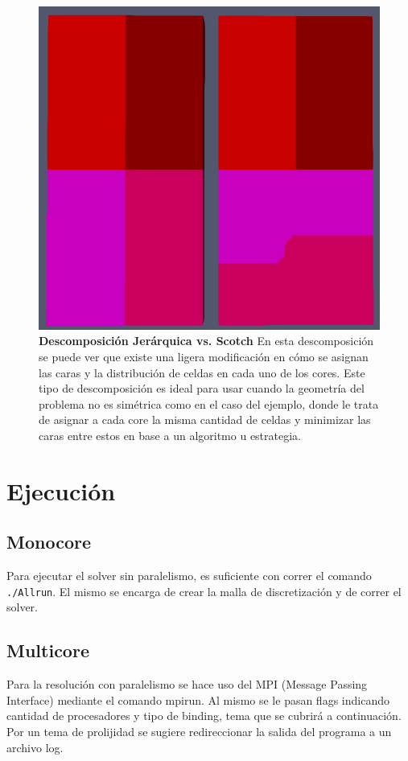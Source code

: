 \documentclass{article}
\begin{document}
\begin{figure} 
    \centering
    \includegraphics[scale=0.5]{../res/imgs/image6.png}
    \caption{\textbf{Descomposición Jerárquica vs. Scotch} En esta descomposición se puede ver que existe una ligera modificación en cómo se asignan las caras y la distribución de celdas en cada uno de los cores. Este tipo de descomposición es ideal para usar cuando la geometría del problema no es simétrica como en el caso del ejemplo, donde le trata de asignar a cada core la misma cantidad de celdas y minimizar las caras entre estos en base a un algoritmo u estrategia.}
\end{figure}

\newpage
\section{Ejecución}
\subsection{Monocore}
Para ejecutar el solver sin paralelismo, es suficiente con correr el comando \texttt{./Allrun}. El mismo se encarga de crear la malla de discretización y de correr el solver.
\subsection{Multicore}
Para la resolución con paralelismo se hace uso del MPI (Message Passing Interface) mediante el comando mpirun. Al mismo se le pasan flags indicando cantidad de procesadores y tipo de binding, tema que se cubrirá a continuación. Por un tema de prolijidad se sugiere redireccionar la salida del programa a un archivo log.
\end{document}
